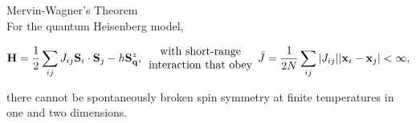 \documentclass{homework}
\begin{document}
\begin{theo}Mervin-Wagner's Theorem \\

For the quantum Heisenberg model, 

$$
    {\bf H} = \frac{1}{2} \sum_{ij} J_{ij} {\bf S}_i \cdot {\bf S}_j - h {{\bf S}}^z_{{\bf q}}, \begin{array}{c}
         \textnormal{with short-range}  \\
         \textnormal{interaction that obey}
    \end{array} \bar{J} = \frac{1}{2N} \sum_{ij} |J_{ij}| |{{\bf x}_i - {\bf x}_j}| < \infty,
$$

there cannot be spontaneously broken spin symmetry at finite temperatures in one and two dimensions.
\end{theo}
\end{document}
